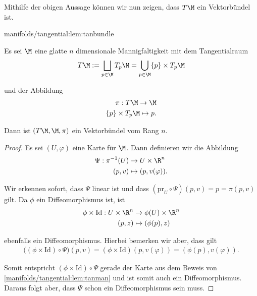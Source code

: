 \documentclass[letterpaper,10pt,german]{jupyterBook}
\begin{document}
\par
Mithilfe der obigen Aussage können wir nun zeigen, dass \(T\M\) ein Vektorbündel ist.
\begin{lemma}{}{manifolds/tangential:lem:tanbundle}



\par
Es sei \(\M\) eine glatte \(n\) dimensionale Mannigfaltigkeit mit dem Tangentialraum
\begin{align*}
T\M:= \bigsqcup_{p\in\M}  T_p\M = \bigcup_{p\in\M} \{p\} \times T_p\M
\end{align*}
\par
und der Abbildung
\begin{align*}
\pi:T\M\to \M\\
\{p\}\times T_p\M\mapsto p.
\end{align*}
\par
Dann ist \((T\M, \M, \pi)\) ein Vektorbündel vom Rang \(n\).
\end{lemma}

\begin{proof}
 Es sei \((U,\varphi)\) eine Karte für \(\M\).
Dann definieren wir die Abbildung
\begin{align*}
\Psi: \pi^{-1}(U) &\to U\times \R^n\\
(p,v) &\mapsto (p, v(\varphi)).
\end{align*}
\par
Wir erkennen sofort, dass \(\Psi\) linear ist und dass \((\text{pr}_U\circ\Psi)(p,v) = p = \pi(p,v)\) gilt.
Da \(\phi\) ein Diffeomorphismus ist, ist
\begin{align*}
\phi\times\text{Id}:U\times \R^n &\to \phi(U)\times\R^n\\
(p,z) &\mapsto (\phi(p), z)
\end{align*}
\par
ebenfalls ein Diffeomorphismus.
Hierbei bemerken wir aber, dass gilt
\begin{align*}
\big((\phi\times\text{Id})\circ \Psi\big)(p,v) = (\phi\times\text{Id})(p, v(\varphi)) = (\phi(p), v(\varphi)).
\end{align*}
\par
Somit entspricht \((\phi\times\text{Id})\circ \Psi\) gerade der Karte aus dem Beweis von \cref{manifolds/tangential:lem:tanman} und ist somit auch ein Diffeomorphismus.
Daraus folgt aber, dass \(\Psi\) schon ein Diffeomorphismus sein muss.
\end{proof}
\end{document}
